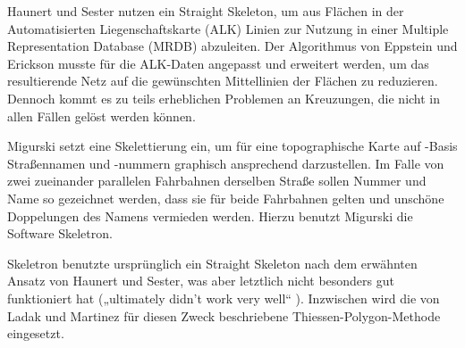 \documentclass[../main/thesis.tex]{subfiles}
\begin{document}

Haunert und Sester nutzen ein Straight Skeleton, um aus Flächen in der Automatisierten Liegenschaftskarte (ALK) Linien zur Nutzung in einer Multiple Representation Database (MRDB) abzuleiten.
Der Algorithmus von Eppstein und Erickson  musste für die ALK-Daten angepasst und erweitert werden, um das resultierende Netz auf die gewünschten Mittellinien der Flächen zu reduzieren.
Dennoch kommt es zu teils erheblichen Problemen an Kreuzungen, die nicht in allen Fällen gelöst werden können. 


Migurski setzt eine Skelettierung ein, um für eine topographische Karte auf \osm-Basis Straßennamen und -nummern graphisch ansprechend darzustellen.
Im Falle von zwei zueinander parallelen Fahrbahnen derselben Straße sollen Nummer und Name so gezeichnet werden, dass sie für beide Fahrbahnen gelten und unschöne Doppelungen des Namens vermieden werden.
Hierzu benutzt Migurski die Software Skeletron. \citetext{\citealp{ME11}, cf. \citealp{Mig12}}


Skeletron benutzte ursprünglich ein Straight Skeleton nach dem erwähnten Ansatz von Haunert und Sester, was aber letztlich nicht besonders gut funktioniert hat („ultimately didn't work very well“ ).
Inzwischen wird die von Ladak und Martinez für diesen Zweck beschriebene Thiessen-Polygon-Methode eingesetzt.

\end{document}
